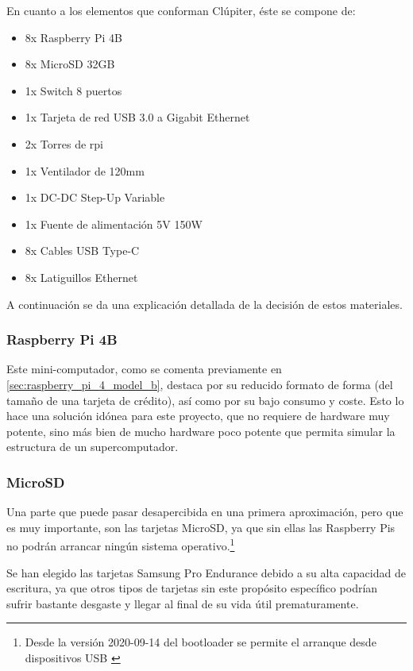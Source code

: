 
En cuanto a los elementos que conforman Clúpiter, éste se compone de:
\begin{itemize}
    \item 8x Raspberry Pi 4B
    \item 8x MicroSD 32GB
    \item 1x Switch 8 puertos
    \item 1x Tarjeta de red USB 3.0 a Gigabit Ethernet 
    \item 2x Torres de \acrshort{rpi}
    \item 1x Ventilador de 120mm
    \item 1x DC-DC Step-Up Variable 
    \item 1x Fuente de alimentación 5V 150W
    \item 8x Cables USB Type-C
    \item 8x Latiguillos Ethernet
\end{itemize}

A continuación se da una explicación detallada de la decisión de estos materiales.

\subsubsection{Raspberry Pi 4B}
Este mini-computador, como se comenta previamente en \ref{sec:raspberry_pi_4_model_b}, destaca por su reducido formato de forma (del tamaño de una tarjeta de crédito), así como por su bajo consumo y coste. Esto lo hace una solución idónea para este proyecto, que no requiere de hardware muy potente, sino más bien de mucho hardware poco potente que permita simular la estructura de un supercomputador.

\subsubsection{MicroSD}
Una parte que puede pasar desapercibida en una primera aproximación, pero que es muy importante, son las tarjetas MicroSD, ya que sin ellas las Raspberry Pis no podrán arrancar ningún sistema operativo.\footnote{Desde la versión 2020-09-14 del bootloader se permite el arranque desde dispositivos USB \cite{rpibootloader20200903}}

Se han elegido las tarjetas Samsung Pro Endurance debido a su alta capacidad de escritura, ya que otros tipos de tarjetas sin este propósito específico podrían sufrir bastante desgaste y llegar al final de su vida útil prematuramente. 


